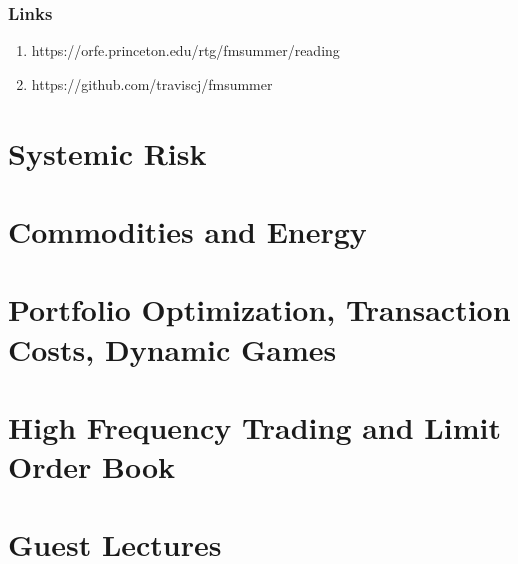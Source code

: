 \documentclass[twocolumn,openany]{book}
\begin{document}
\section{Links}
\begin{enumerate}
	\item https://orfe.princeton.edu/rtg/fmsummer/reading
	\item https://github.com/traviscj/fmsummer
\end{enumerate}

\part{Systemic Risk}

\part{Commodities and Energy}

\part{Portfolio Optimization, Transaction Costs, Dynamic Games}

\part{High Frequency Trading and Limit Order Book}

\part{Guest Lectures}




\end{document}

